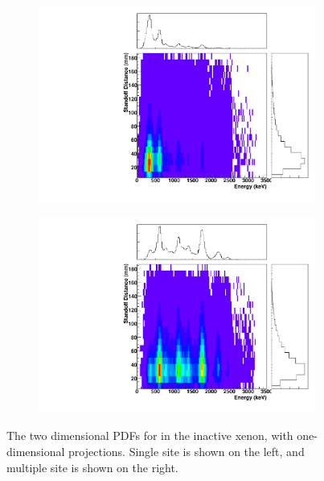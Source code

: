 \documentclass[herrin-thesis.tex]{subfiles}
\begin{document}
\begin{figure}[hp]
\centering
	\begin{subfigure}[b]{0.48\textwidth}
	\centering
	\includegraphics[width=\textwidth]{./plots/PDFs/analysis_pdf_InactiveLXe_Rn222_ss.pdf}
\end{subfigure}\hfill%
\begin{subfigure}[b]{0.48\textwidth}
	\centering
	\includegraphics[width=1\textwidth]{./plots/PDFs/analysis_pdf_InactiveLXe_Rn222_ms.pdf}
	\end{subfigure}
\caption[PDF for  in the inactive xenon]{The two dimensional PDFs for  in the inactive xenon, with one-dimensional projections. Single site is shown on the left, and multiple site is shown on the right.}
\label{fig:analysis_pdf_InactiveLXe_Rn222}
\end{figure}
\end{document}
